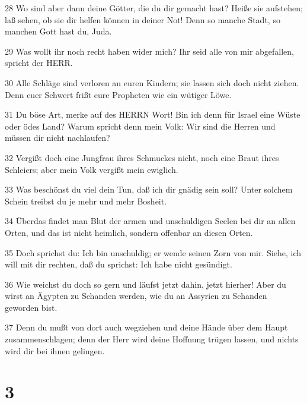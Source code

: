 \par 28 Wo sind aber dann deine Götter, die du dir gemacht hast? Heiße sie aufstehen; laß sehen, ob sie dir helfen können in deiner Not! Denn so manche Stadt, so manchen Gott hast du, Juda.
\par 29 Was wollt ihr noch recht haben wider mich? Ihr seid alle von mir abgefallen, spricht der HERR.
\par 30 Alle Schläge sind verloren an euren Kindern; sie lassen sich doch nicht ziehen. Denn euer Schwert frißt eure Propheten wie ein wütiger Löwe.
\par 31 Du böse Art, merke auf des HERRN Wort! Bin ich denn für Israel eine Wüste oder ödes Land? Warum spricht denn mein Volk: Wir sind die Herren und müssen dir nicht nachlaufen?
\par 32 Vergißt doch eine Jungfrau ihres Schmuckes nicht, noch eine Braut ihres Schleiers; aber mein Volk vergißt mein ewiglich.
\par 33 Was beschönst du viel dein Tun, daß ich dir gnädig sein soll? Unter solchem Schein treibst du je mehr und mehr Bosheit.
\par 34 Überdas findet man Blut der armen und unschuldigen Seelen bei dir an allen Orten, und das ist nicht heimlich, sondern offenbar an diesen Orten.
\par 35 Doch sprichst du: Ich bin unschuldig; er wende seinen Zorn von mir. Siehe, ich will mit dir rechten, daß du sprichst: Ich habe nicht gesündigt.
\par 36 Wie weichst du doch so gern und läufst jetzt dahin, jetzt hierher! Aber du wirst an Ägypten zu Schanden werden, wie du an Assyrien zu Schanden geworden bist.
\par 37 Denn du mußt von dort auch wegziehen und deine Hände über dem Haupt zusammenschlagen; denn der Herr wird deine Hoffnung trügen lassen, und nichts wird dir bei ihnen gelingen.

\chapter{3}


